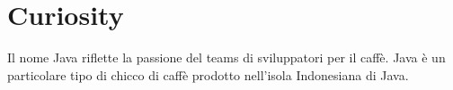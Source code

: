 \documentclass{article}
\theoremstyle{definition}
\begin{document}


\section{Curiosity}
\begin{framed}
Il nome  Java riflette la passione del teams di sviluppatori per il caff\`e. Java \`e un particolare tipo di chicco di caff\`e prodotto nell'isola  Indonesiana  di Java.
\end{framed}


\clearpage







\nocite{*}
\end{document}
